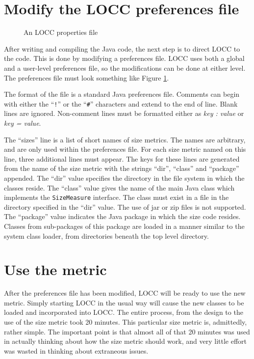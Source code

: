 \section{Modify the LOCC preferences file}

\begin{figure}
  \centering
  
  \caption{An LOCC properties file}
  \label{fig:locc-prefs}
\end{figure}

After writing and compiling the Java code, the next step is to direct
LOCC to the code.  This is done by modifying a preferences file.  LOCC 
uses both a global and a user-level preferences file, so the
modifications can be done at either level.  The preferences file must
look something like Figure \ref{fig:locc-prefs}.  

The format of the file is a standard Java preferences file.  Comments
can begin with either the ``{\tt !}'' or the ``{\tt \#}'' characters
and extend to the end of line.  Blank lines are ignored.  Non-comment
lines must be formatted either as {\em key : value\/} or {\em key = value\/}.

The ``sizes'' line is a list of short names of size metrics.  The names are
arbitrary, and are only used within the preferences file.  For each
size metric named on this line, three additional lines must appear.  
The keys for these lines are generated from the name of the size
metric with the strings ``dir'', ``class'' and ``package''
appended. The ``dir'' value specifies the directory in the file system
in which the classes reside.  The ``class'' value gives the name of
the main Java class which implements the {\tt SizeMeasure} interface.  
The class must exist in a file in the directory
specified in the ``dir'' value.  The use of jar or zip files is not
supported.  The ``package'' value indicates the Java package in which
the size code resides.  Classes from sub-packages of this package are
loaded in a manner similar to the system class loader, from
directories beneath the top level directory.

\section{Use the metric}

After the preferences file has been modified, LOCC will be ready to
use the new metric.  Simply starting LOCC in the usual way will cause
the new classes to be loaded and incorporated into LOCC.  The entire
process, from the design to the use of the size metric took 20
minutes.  This particular size metric is, admittedly, rather simple.
The important point is that almost all of that 20 minutes was used in
actually thinking about how the size metric should work, and very
little effort was wasted in thinking about extraneous issues.
